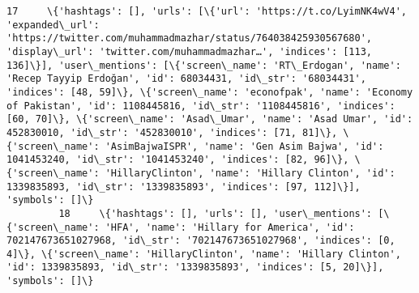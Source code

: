 \documentclass[11pt]{article}
\begin{document}
\begin{Verbatim}[commandchars=\\\{\}]
         17     \{'hashtags': [], 'urls': [\{'url': 'https://t.co/LyimNK4wV4', 'expanded\_url': 'https://twitter.com/muhammadmazhar/status/764038425930567680', 'display\_url': 'twitter.com/muhammadmazhar…', 'indices': [113, 136]\}], 'user\_mentions': [\{'screen\_name': 'RT\_Erdogan', 'name': 'Recep Tayyip Erdoğan', 'id': 68034431, 'id\_str': '68034431', 'indices': [48, 59]\}, \{'screen\_name': 'econofpak', 'name': 'Economy of Pakistan', 'id': 1108445816, 'id\_str': '1108445816', 'indices': [60, 70]\}, \{'screen\_name': 'Asad\_Umar', 'name': 'Asad Umar', 'id': 452830010, 'id\_str': '452830010', 'indices': [71, 81]\}, \{'screen\_name': 'AsimBajwaISPR', 'name': 'Gen Asim Bajwa', 'id': 1041453240, 'id\_str': '1041453240', 'indices': [82, 96]\}, \{'screen\_name': 'HillaryClinton', 'name': 'Hillary Clinton', 'id': 1339835893, 'id\_str': '1339835893', 'indices': [97, 112]\}], 'symbols': []\}                                                                                                                                                                                                                                                                                                                           
         18     \{'hashtags': [], 'urls': [], 'user\_mentions': [\{'screen\_name': 'HFA', 'name': 'Hillary for America', 'id': 702147673651027968, 'id\_str': '702147673651027968', 'indices': [0, 4]\}, \{'screen\_name': 'HillaryClinton', 'name': 'Hillary Clinton', 'id': 1339835893, 'id\_str': '1339835893', 'indices': [5, 20]\}], 'symbols': []\}                                                                                                                                                                                                                                                                                                                                                                                                                                                                                                                                                                                                                                                                                                                                                                                                                                                                                 

\end{Verbatim}
\end{document}
